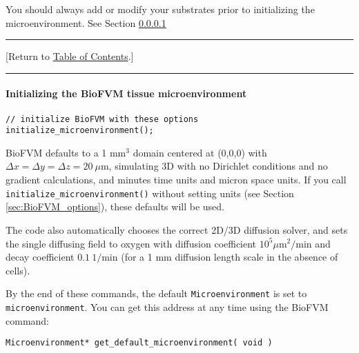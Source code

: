 \documentclass[12pt]{article}
\newcommand{\micron}{\mu\textrm{m}}
\renewcommand{\v}{\verb}
\newcommand{\TOClink}{\begin{center}\hrule\vskip-5pt\phantom{.}\hfill[Return to \hyperlink{TOC}{Table of Contents}.]\hfill\phantom{.}\vskip3pt\hrule\end{center}}
\begin{document}
You should always add or modify your substrates prior to initializing the microenvironment. See 
Section \ref{sec:BioFVM_initialize}

\TOClink 

\paragraph{Initializing the BioFVM tissue microenvironment}
\label{sec:BioFVM_initialize}

\begin{verbatim}
// initialize BioFVM with these options
initialize_microenvironment(); 	
\end{verbatim}

BioFVM defaults to a 1 mm${}^3$ domain centered at 
(0,0,0) with $\Delta x = \Delta y = \Delta z = 20 \:\micron$, simulating 3D with no Dirichlet conditions 
and no gradient calculations, and minutes time units 
and micron space units. If you call 
\v|initialize_microenvironment()| without setting units (see Section \ref{sec:BioFVM_options}), 
these defaults will be used. 

The code also automatically chooses the correct 
2D/3D diffusion solver, and sets the single diffusing 
field to oxygen with diffusion coefficient 
$10^5 \micron^2/\textrm{min}$ and decay coefficient 
$0.1 \: 1/\textrm{min}$ (for a 1 mm diffusion length scale 
in the absence of cells). 

% 

By the end of these commands, the default \v|Microenvironment| is 
set to \v|microenvironment|. You can get this address at any time using 
the BioFVM command: 

\v|Microenvironment* get_default_microenvironment( void )|
\end{document}
